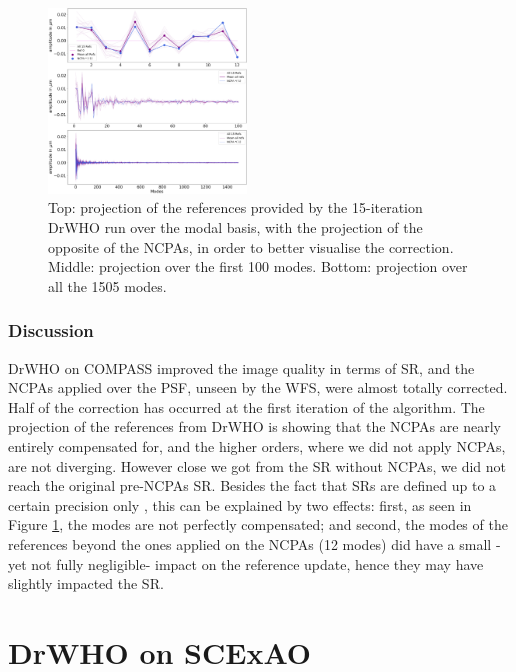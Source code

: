 \documentclass[twocolumn]{aa}
\begin{document}
\begin{figure}[t]
\begin{center}
\includegraphics[width=0.47\textwidth]{fig/ho_modes.png}
\caption{Top: projection of the references provided by the 15-iteration DrWHO run over the modal basis, with the projection of the opposite of the NCPAs, in order to better visualise the correction. Middle: projection over the first 100 modes. Bottom: projection over all the 1505 modes.}
\label{fig:ho_modes}
\end{center}
\end{figure}

\subsubsection{Discussion}
DrWHO on COMPASS improved the image quality in terms of SR, and the NCPAs applied over the PSF, unseen by the WFS, were almost totally corrected. Half of the correction has occurred at the first iteration of the algorithm. The projection of the references from DrWHO is showing that the NCPAs are nearly entirely compensated for, and the higher orders, where we did not apply NCPAs, are not diverging. 
However close we got from the SR without NCPAs, we did not reach the original pre-NCPAs SR. Besides the fact that SRs are defined up to a certain precision only \citep{Roberts2004Strehl}, this can be explained by two effects: first, as seen in Figure \ref{fig:ho_modes}, the modes are not perfectly compensated; and second, the modes of the references beyond the ones applied on the NCPAs (12 modes) did have a small -yet not fully negligible- impact on the reference update, hence they may have slightly impacted the SR.\\



\section{DrWHO on SCExAO}\label{sec:drwhoscexao}
\end{document}
